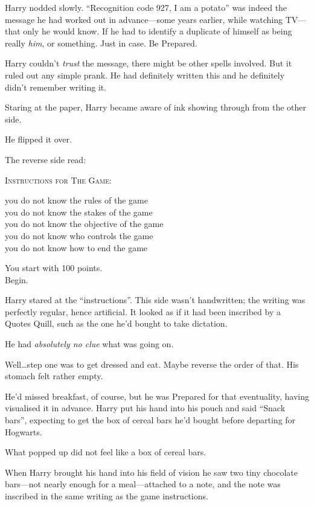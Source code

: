 Harry nodded slowly. “Recognition code 927, I am a potato” was indeed the message he had worked out in advance—some years earlier, while watching TV—that only he would know. If he had to identify a duplicate of himself as being really \emph{him}, or something. Just in case. Be Prepared.

Harry couldn’t \emph{trust} the message, there might be other spells involved. But it ruled out any simple prank. He had definitely written this and he definitely didn’t remember writing it.

Staring at the paper, Harry became aware of ink showing through from the other side.

He flipped it over.

The reverse side read:

\begin{writtenNote}\centering
\textsc{Instructions for The Game:}

you do not know the rules of the game\\
you do not know the stakes of the game\\
you do not know the objective of the game\\
you do not know who controls the game\\
you do not know how to end the game

You start with 100 points.\\
Begin.
\end{writtenNote}

Harry stared at the “instructions”. This side wasn’t handwritten; the writing was perfectly regular, hence artificial. It looked as if it had been inscribed by a Quotes Quill, such as the one he’d bought to take dictation.

He had \emph{absolutely no clue} what was going on.

Well…step one was to get dressed and eat. Maybe reverse the order of that. His stomach felt rather empty.

He’d missed breakfast, of course, but he was Prepared for that eventuality, having visualised it in advance. Harry put his hand into his pouch and said “Snack bars”, expecting to get the box of cereal bars he’d bought before departing for Hogwarts.

What popped up did not feel like a box of cereal bars.

When Harry brought his hand into his field of vision he saw two tiny chocolate bars—not nearly enough for a meal—attached to a note, and the note was inscribed in the same writing as the game instructions.

